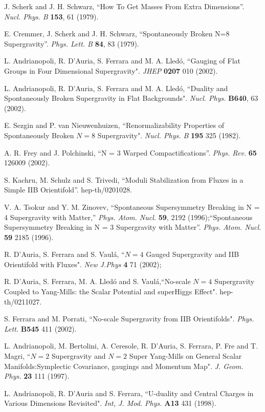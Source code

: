 \documentclass[a4paper,12pt]{article}
\begin{document}
\begin{thebibliography}{99}
J. Scherk and J. H. Schwarz, ``How To Get Masses From Extra
Dimensions''. {\it Nucl. Phys. B} {\bf 153}, 61 (1979).

 E. Cremmer, J. Scherk and J. H. Schwarz,
 ``Spontaneously Broken N=8 Supergravity''.
{\it Phys. Lett. B} {\bf 84}, 83 (1979).


 L. Andrianopoli, R. D'Auria, S. Ferrara and M. A. Lled\'o, ``Gauging of Flat
Groups in Four Dimensional Supergravity". {\it JHEP} {\bf 0207} 010 (2002).

 L. Andrianopoli, R. D'Auria, S. Ferrara and M. A. Lled\'o, ``Duality and
Spontaneously Broken Supergravity in Flat Backgrounds".
{\it  Nucl. Phys. } {\bf B640}, 63 (2002).

E. Sezgin and P. van Nieuwenhuizen, ``Renormalizability Properties
of Spontaneously Broken $N=8$ Supergravity". {\it Nucl. Phys. B}
{\bf 195}  325 (1982).

A. R. Frey and J. Polchinski, ``N = 3 Warped Compactifications''. {\it Phys. Rev.}  {\bf 65}
126009 (2002).

S. Kachru, M. Schulz and S. Trivedi,
 ``Moduli Stabilization from Fluxes in a Simple IIB Orientifold''.
 hep-th/0201028.

V. A. Tsokur and Y. M. Zinovev, ``Spontaneous Supersymmetry
Breaking in N = 4 Supergravity with Matter,'' {\it Phys.  Atom.
Nucl.}  {\bf 59}, 2192 (1996);``Spontaneous Supersymmetry Breaking
in N = 3 Supergravity with Matter''. {\it Phys.  Atom.  Nucl.}
{\bf 59} 2185 (1996).

 R. D'Auria, S. Ferrara and  S. Vaul\'a, ``$N=4$ Gauged Supergravity and IIB
Orientifold with Fluxes". {\it New J.Phys} {\bf 4} 71 (2002);

R. D'Auria, S. Ferrara, M. A. Lled\'o and S. Vaul\'a,``No-scale
$N=4$ Supergravity Coupled to Yang-Mills: the Scalar Potential and
superHiggs Effect". hep-th/0211027.

 S. Ferrara and M. Porrati, ``No-scale Supergravity from IIB Orientifolds".  {\it
Phys. Lett.} {\bf B545} 411 (2002).


 L. Andrianopoli, M. Bertolini, A. Ceresole, R. D'Auria, S. Ferrara, P. Fre and T.
Magri,
``$N=2$ Supergravity and $N=2$ Super Yang-Mills on General Scalar Manifolds:Symplectic Covariance,
gaugings and Momentum Map". {\it J. Geom. Phys.} {\bf 23} 111 (1997).

 L. Andrianopoli, R. D'Auria and  S. Ferrara, ``U-duality and Central Charges in Various
Dimensions Revisited". {\it Int, J. Mod. Phys. } {\bf A13} 431 (1998).


\end{thebibliography}
\end{document}

